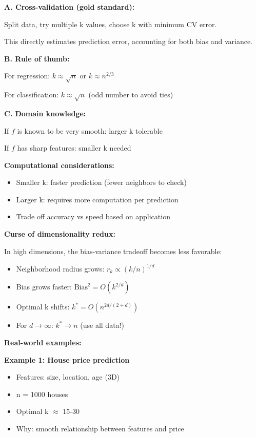 \documentclass[12pt]{article}
\begin{document}
\begin{explanation}
\textbf{A. Cross-validation (gold standard):}

Split data, try multiple k values, choose k with minimum CV error.

This directly estimates prediction error, accounting for both bias and variance.

\textbf{B. Rule of thumb:}

For regression: $k \approx \sqrt{n}$ or $k \approx n^{2/3}$

For classification: $k \approx \sqrt{n}$ (odd number to avoid ties)

\textbf{C. Domain knowledge:}

If $f$ is known to be very smooth: larger k tolerable

If $f$ has sharp features: smaller k needed

\textbf{Computational considerations:}

\begin{itemize}
    \item Smaller k: faster prediction (fewer neighbors to check)
    \item Larger k: requires more computation per prediction
    \item Trade off accuracy vs speed based on application
\end{itemize}

\textbf{Curse of dimensionality redux:}

In high dimensions, the bias-variance tradeoff becomes less favorable:
\begin{itemize}
    \item Neighborhood radius grows: $r_k \propto (k/n)^{1/d}$
    \item Bias grows faster: $\text{Bias}^2 = O(k^{2/d})$
    \item Optimal k shifts: $k^* = O(n^{2d/(2+d)})$
    \item For $d \to \infty$: $k^* \to n$ (use all data!)
\end{itemize}

\textbf{Real-world examples:}

\textbf{Example 1: House price prediction}

\begin{itemize}
    \item Features: size, location, age (3D)
    \item n = 1000 houses
    \item Optimal k $\approx$ 15-30
    \item Why: smooth relationship between features and price
\end{itemize}


\end{explanation}
\end{document}
